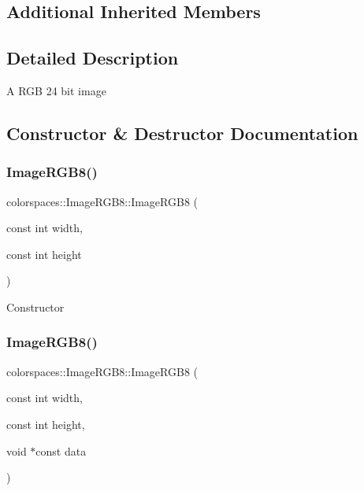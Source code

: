 \subsection*{Additional Inherited Members}


\subsection{Detailed Description}
A R\+GB 24 bit image 

\subsection{Constructor \& Destructor Documentation}
\mbox{\label{classcolorspaces_1_1_image_r_g_b8_abd15a24925b09fe2ae1f89f9a095b6a8}} 
\subsubsection{\texorpdfstring{Image\+R\+G\+B8()}{ImageRGB8()}\hspace{0.1cm}{\footnotesize\ttfamily [1/3]}}
{\footnotesize\ttfamily colorspaces\+::\+Image\+R\+G\+B8\+::\+Image\+R\+G\+B8 (\begin{DoxyParamCaption}\item[{const int}]{width,  }\item[{const int}]{height }\end{DoxyParamCaption})}

Constructor \mbox{\label{classcolorspaces_1_1_image_r_g_b8_a17e496d63e4c4c32893746fefe75ae9a}} 
\subsubsection{\texorpdfstring{Image\+R\+G\+B8()}{ImageRGB8()}\hspace{0.1cm}{\footnotesize\ttfamily [2/3]}}
{\footnotesize\ttfamily colorspaces\+::\+Image\+R\+G\+B8\+::\+Image\+R\+G\+B8 (\begin{DoxyParamCaption}\item[{const int}]{width,  }\item[{const int}]{height,  }\item[{void $\ast$const}]{data }\end{DoxyParamCaption})}

